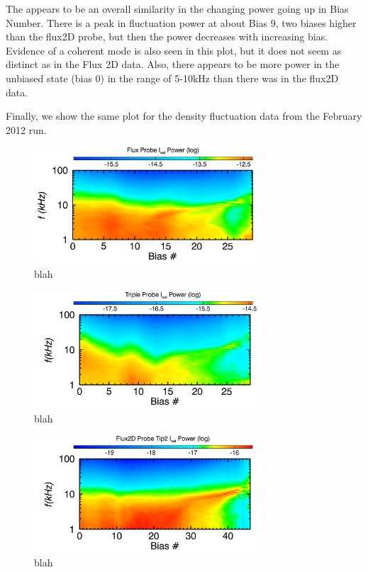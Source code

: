 \documentclass[aip,pop,amsmath,amssymb,preprint,superscriptaddress]{revtex4-1} %
\begin{document}
The appears to be an overall similarity in the changing power going up in Bias Number. There is a peak in fluctuation power at about Bias 9, two biases higher than the flux2D probe,  but then the power decreases with increasing bias. Evidence of a coherent mode is also seen in this plot, but it does not seem as distinct as in the Flux 2D data.  Also, there appears to be more power in the unbiased state (bias 0) in the range of 5-10kHz than there was in the flux2D data.

Finally, we show the same plot for the density fluctuation data from the February 2012 run. 

\begin{figure}[!htbp]
\centerline{
\includegraphics[width=8.5cm]{flux_flucs}}
\caption{\label{fig:flux_flucs} blah}
\end{figure}

\begin{figure}[!htbp]
\centerline{
\includegraphics[width=8.5cm]{trip_flucs}}
\caption{\label{fig:trip_flucs} blah}
\end{figure}

\begin{figure}[!htbp]
\centerline{
\includegraphics[width=8.5cm]{flux_flucs_feb12}}
\caption{\label{fig:flux_flucs_feb12} blah}
\end{figure}
\end{document}
